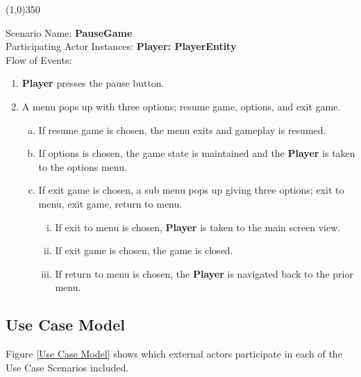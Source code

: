 \documentclass[12pt]{article}       %
\begin{document}
\begin{center} \line(1,0){350} \end{center}
Scenario Name: {\bf PauseGame} \\
Participating Actor Instances:        \hspace{46pt} {\bf Player: PlayerEntity }  \vspace{10pt}  \\ 
Flow of Events: 
\begin{enumerate} 
\item {\bf Player} presses the pause button.
\item A menu pops up with three options; resume game, options, and exit game.
      \begin{enumerate}[a.]
      \item If resume game is chosen, the menu exits and gameplay is resumed.
      \item If options is chosen, the game state is maintained and the {\bf Player} is taken to the options menu.
      \item If exit game is chosen, a sub menu pops up giving three options; exit to menu, exit game, return to menu.
                \begin{enumerate}[i.]
                \item If exit to menu is chosen, {\bf Player} is taken to the main screen view.
                \item If exit game is chosen, the game is closed.
                \item If return to menu is chosen, the {\bf Player} is navigated back to the prior menu.
                \end{enumerate}
        \end{enumerate}
\end{enumerate}


\subsection{Use Case Model}
Figure \ref{Use Case Model} shows which external actors participate in each of the Use Case Scenarios included.
\end{document}
